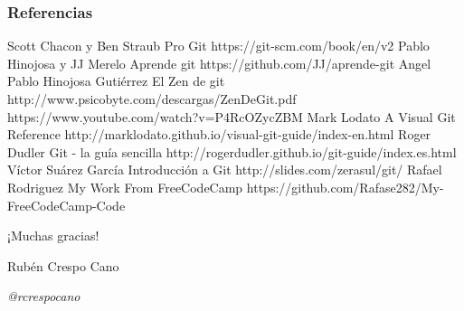 \documentclass{beamer}
\begin{document}
\begin{frame}
\frametitle{Referencias}
\begin{thebibliography}{99}
\tiny
\bibitem{} Scott Chacon y Ben Straub
\newblock Pro Git
\newblock https://git-scm.com/book/en/v2
\bibitem{} Pablo Hinojosa y JJ Merelo
\newblock Aprende git
\newblock https://github.com/JJ/aprende-git
\bibitem{} Angel Pablo Hinojosa Gutiérrez
\newblock El Zen de git
\newblock http://www.psicobyte.com/descargas/ZenDeGit.pdf
\newblock https://www.youtube.com/watch?v=P4RcOZycZBM
\bibitem{} Mark Lodato
\newblock A Visual Git Reference
\newblock http://marklodato.github.io/visual-git-guide/index-en.html
\bibitem{} Roger Dudler 
\newblock Git - la guía sencilla
\newblock http://rogerdudler.github.io/git-guide/index.es.html
\bibitem{} Víctor Suárez García
\newblock  Introducción a Git
\newblock http://slides.com/zerasul/git/
\bibitem{} Rafael Rodriguez
\newblock My Work From FreeCodeCamp
\newblock https://github.com/Rafase282/My-FreeCodeCamp-Code
\end{thebibliography}
\end{frame}

\begin{frame}
\Huge{\centerline{¡Muchas gracias!}}
\vskip 1.50cm
\small{\centerline{Rubén Crespo Cano}}
\vskip 0.15cm
\small{\centerline{{\color{gray}\textit{@rcrespocano}}}}
\end{frame}
\end{document}
